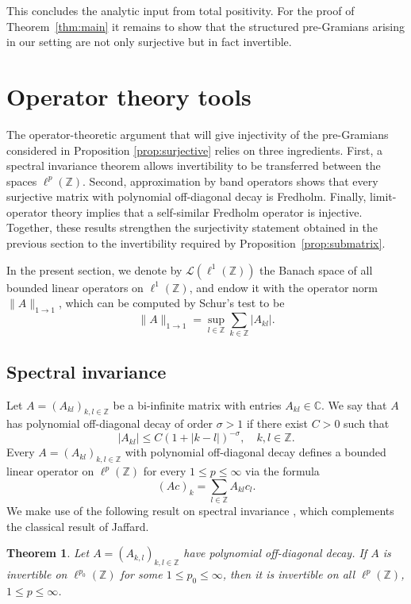\documentclass[reqno,a4paper,12pt]{amsart}
\numberwithin{equation}{section}
\newtheorem{theorem}[definition]{Theorem}
\def\Z{{\mathbb Z}}
\def\C{{\mathbb C}}
\newcommand\1{\mathds{1}}
\begin{document}
This concludes the analytic input from total positivity. For the proof
of Theorem~\ref{thm:main} it remains to show that the structured
pre-Gramians arising in our setting are not only surjective but in
fact invertible. 

\section{Operator theory tools}

The operator-theoretic argument that will give injectivity of the pre-Gramians considered in Proposition \ref{prop:surjective} relies on three ingredients. First, a spectral invariance theorem allows invertibility to be transferred between the spaces $\ell^p(\Z)$. Second, approximation by band operators shows that every surjective matrix with polynomial off-diagonal decay is Fredholm. Finally, limit-operator theory implies that a self-similar Fredholm operator is injective. Together, these results strengthen the surjectivity statement obtained in the previous section to the invertibility required by Proposition~\ref{prop:submatrix}.

In the present section, we denote by $\mathcal{L}({\ell^1(\Z)})$ the
Banach space of all bounded linear operators on ${\ell^1(\Z)}$, and
endow it with the operator norm $\| A \|_{1 \to 1}$, which can be
computed by Schur's test to be 
\begin{equation}\label{eq:op_norm_bound}
    \| A \|_{1 \to 1} 
    =\sup_{l\in\mathbb Z}\sum_{k\in\mathbb Z}|A_{kl}|.
\end{equation}


\subsection{Spectral invariance}

Let $A = (A_{kl})_{k,l \in \Z}$ be a bi-infinite matrix with entries $A_{kl} \in \C$. We say that $A$ has polynomial off-diagonal decay of order $\sigma>1$ if there exist $C>0$ such that
$$
|A_{kl}|\le C(1+|k-l|)^{-\sigma},
\quad k,l\in\mathbb Z.
$$
Every $A = (A_{kl})_{k,l \in \Z}$ with polynomial off-diagonal decay defines a bounded linear operator on $ \ell^p(\mathbb Z)$ for every $1 \leq p \leq \infty$ via the formula
$$
(Ac)_k = \sum_{l \in \Z} A_{kl}c_l.
$$
We make use of the following  result on spectral invariance
\cite{ShinSun2009,Tessera2010}, which complements the classical result of
Jaffard. 

\begin{theorem}\label{thm:spec_inv}
     Let $A=(A_{k,l})_{k,l\in\Z}$ have polynomial off-diagonal decay.
    If $A$ is invertible on $\ell^{p_0}(\Z)$ for some $1\leq p_0\leq \infty$, then it is invertible on all $\ell^p(\Z)$, $1\leq p\leq \infty$.
\end{theorem}
\end{document}
